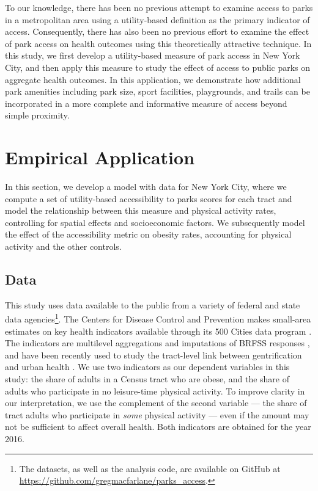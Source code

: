 \documentclass[shortAfour,sageh.bst]{sagej}
\begin{document}
To our knowledge, there has been no previous attempt to examine access
to parks in a metropolitan area using a utility-based definition as the
primary indicator of access. Consequently, there has also been no
previous effort to examine the effect of park access on health outcomes
using this theoretically attractive technique. In this study, we first
develop a utility-based measure of park access in New York City, and
then apply this measure to study the effect of access to public parks on
aggregate health outcomes. In this application, we demonstrate how
additional park amenities including park size, sport facilities,
playgrounds, and trails can be incorporated in a more complete and
informative measure of access beyond simple proximity.

\hypertarget{empirical-application}{%
\section{Empirical Application}\label{empirical-application}}

In this section, we develop a model with data for New York City, where
we compute a set of utility-based accessibility to parks scores for each
tract and model the relationship between this measure and physical
activity rates, controlling for spatial effects and socioeconomic
factors. We subsequently model the effect of the accessibility metric on
obesity rates, accounting for physical activity and the other controls.

\hypertarget{data}{%
\subsection{Data}\label{data}}

This study uses data available to the public from a variety of federal
and state data agencies\footnote{The datasets, as well as the analysis
  code, are available on GitHub at
  \url{https://github.com/gregmacfarlane/parks_access}.}. The Centers
for Disease Control and Prevention makes small-area estimates on key
health indicators available through its 500 Cities data program
\citep{CDC5002016}. The indicators are multilevel aggregations and
imputations of BRFSS responses \citep{Wang2018, Wang2017}, and have been
recently used to study the tract-level link between gentrification and
urban health \citep{Gibbons2018}. We use two indicators as our dependent
variables in this study: the share of adults in a Census tract who are
obese, and the share of adults who participate in no leisure-time
physical activity. To improve clarity in our interpretation, we use the
complement of the second variable --- the share of tract adults who
participate in \emph{some} physical activity --- even if the amount may
not be sufficient to affect overall health. Both indicators are obtained
for the year 2016.
\end{document}
